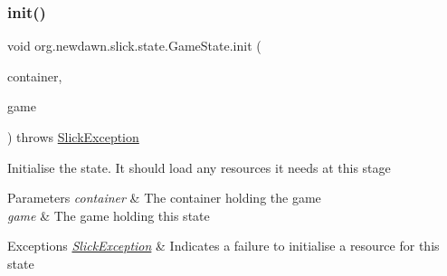 \mbox{\label{interfaceorg_1_1newdawn_1_1slick_1_1state_1_1_game_state_aa799a369e0fcfe6822d2d586fa6f5bbc}} 
\subsubsection{\texorpdfstring{init()}{init()}}
{\footnotesize\ttfamily void org.\+newdawn.\+slick.\+state.\+Game\+State.\+init (\begin{DoxyParamCaption}\item[{\mbox{\hyperlink{classorg_1_1newdawn_1_1slick_1_1_game_container}{Game\+Container}}}]{container,  }\item[{\mbox{\hyperlink{classorg_1_1newdawn_1_1slick_1_1state_1_1_state_based_game}{State\+Based\+Game}}}]{game }\end{DoxyParamCaption}) throws \mbox{\hyperlink{classorg_1_1newdawn_1_1slick_1_1_slick_exception}{Slick\+Exception}}}

Initialise the state. It should load any resources it needs at this stage


\begin{DoxyParams}{Parameters}
{\em container} & The container holding the game \\
\hline
{\em game} & The game holding this state \\
\hline
\end{DoxyParams}

\begin{DoxyExceptions}{Exceptions}
{\em \mbox{\hyperlink{classorg_1_1newdawn_1_1slick_1_1_slick_exception}{Slick\+Exception}}} & Indicates a failure to initialise a resource for this state \\
\hline
\end{DoxyExceptions}



